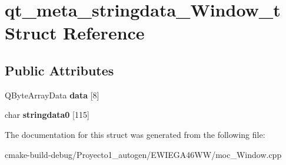 \hypertarget{structqt__meta__stringdata___window__t}{}\section{qt\+\_\+meta\+\_\+stringdata\+\_\+\+Window\+\_\+t Struct Reference}
\label{structqt__meta__stringdata___window__t}
\subsection*{Public Attributes}
\begin{DoxyCompactItemize}
\item 
Q\+Byte\+Array\+Data {\bfseries data} \mbox{[}8\mbox{]}\hypertarget{structqt__meta__stringdata___window__t_a755d83c417937cb5375eca96a98c225f}{}\label{structqt__meta__stringdata___window__t_a755d83c417937cb5375eca96a98c225f}

\item 
char {\bfseries stringdata0} \mbox{[}115\mbox{]}\hypertarget{structqt__meta__stringdata___window__t_a79545bba4edbc854bf54a84e8dd07843}{}\label{structqt__meta__stringdata___window__t_a79545bba4edbc854bf54a84e8dd07843}

\end{DoxyCompactItemize}


The documentation for this struct was generated from the following file\+:\begin{DoxyCompactItemize}
\item 
cmake-\/build-\/debug/\+Proyecto1\+\_\+autogen/\+E\+W\+I\+E\+G\+A46\+W\+W/moc\+\_\+\+Window.\+cpp\end{DoxyCompactItemize}
